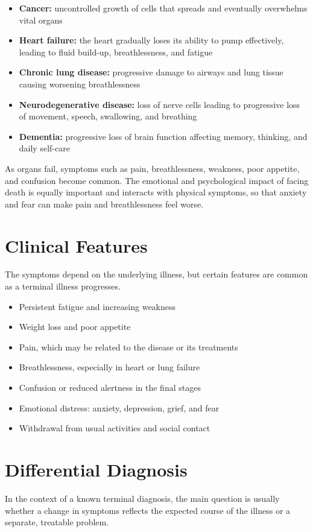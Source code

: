 \begin{itemize}
    \item \textbf{Cancer:} uncontrolled growth of cells that spreads and eventually overwhelms vital organs
    \item \textbf{Heart failure:} the heart gradually loses its ability to pump effectively, leading to fluid build-up, breathlessness, and fatigue
    \item \textbf{Chronic lung disease:} progressive damage to airways and lung tissue causing worsening breathlessness
    \item \textbf{Neurodegenerative disease:} loss of nerve cells leading to progressive loss of movement, speech, swallowing, and breathing
    \item \textbf{Dementia:} progressive loss of brain function affecting memory, thinking, and daily self-care
\end{itemize}

As organs fail, symptoms such as pain, breathlessness, weakness, poor appetite, and confusion become common. The emotional and psychological impact of facing death is equally important and interacts with physical symptoms, so that anxiety and fear can make pain and breathlessness feel worse.

\section*{Clinical Features}
The symptoms depend on the underlying illness, but certain features are common as a terminal illness progresses.

\begin{itemize}
    \item Persistent fatigue and increasing weakness
    \item Weight loss and poor appetite
    \item Pain, which may be related to the disease or its treatments
    \item Breathlessness, especially in heart or lung failure
    \item Confusion or reduced alertness in the final stages
    \item Emotional distress: anxiety, depression, grief, and fear
    \item Withdrawal from usual activities and social contact
\end{itemize}

\section*{Differential Diagnosis}
In the context of a known terminal diagnosis, the main question is usually whether a change in symptoms reflects the expected course of the illness or a separate, treatable problem.


